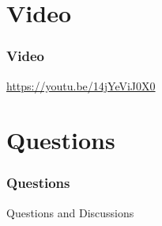 \section*{Video}
\begin{frame}
\frametitle{Video}
\begin{center}
\url{https://youtu.be/14jYeViJ0X0}
\end{center}
\end{frame}


\section*{Questions}

\begin{frame}
\frametitle{Questions}
\begin{center}
Questions and Discussions
\end{center}
\end{frame}


%
%


